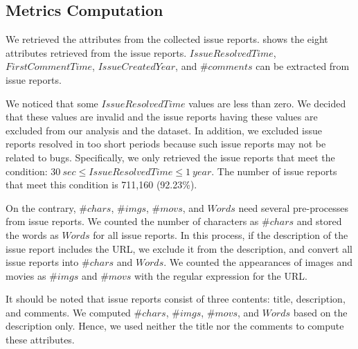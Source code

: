 \subsection{Metrics Computation}

We retrieved the attributes from the collected issue reports.
 shows the eight attributes 
retrieved from the issue reports. 
$IssueResolvedTime$, $FirstCommentTime$,
$IssueCreatedYear$, and $\#comments$ can be extracted from issue reports. 

We noticed that some $IssueResolvedTime$ values are less than zero. 
We decided that these values are invalid and the issue reports having 
these values are excluded from our analysis and the dataset. 
In addition, we excluded issue reports resolved in 
too short periods because such issue reports may not 
be related to bugs. 
Specifically, we only retrieved the issue reports that meet 
the condition: $30\ sec \leq IssueResolvedTime \leq 1\ year$.
The number of issue reports that meet this condition is 711,160 (92.23\%).

On the contrary, $\#chars$, $\#imgs$, $\#movs$, and $Words$ need several pre-processes from issue reports. 
We counted the number of characters as $\#chars$ and 
stored the words as $Words$ for all issue reports. 
In this process, if the description of the issue report 
includes the URL, we exclude it from the description, 
and convert all issue reports into $\#chars$ and $Words$.
We counted the appearances of images and movies
as $\#imgs$ and $\#movs$
with the regular expression for the URL.

It should be noted that issue reports consist of three contents: 
title, description, and comments. 
We computed $\#chars$, $\#imgs$, $\#movs$, and $Words$ based on the description only. 
Hence, we used neither the title nor the comments 
to compute these attributes.


